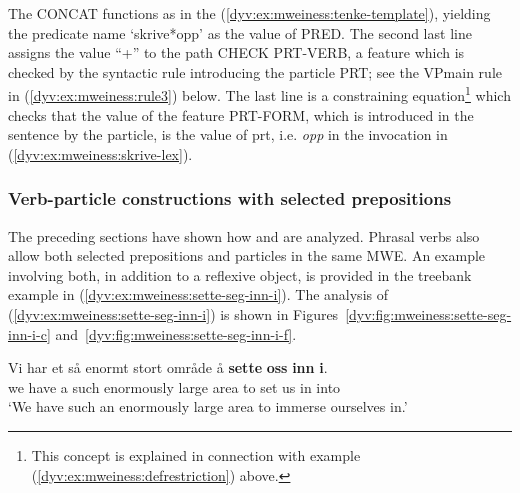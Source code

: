 \documentclass[output=paper]{langsci/langscibook}
\begin{document}
The CONCAT  functions as in the  (\ref{dyv:ex:mweiness:tenke-template}), yielding the  predicate name `skrive*opp' as the value of PRED.
The second last line assigns the value ``+'' to the path CHECK PRT-VERB, a feature which is checked by the syntactic rule introducing the particle PRT; see the VPmain rule in (\ref{dyv:ex:mweiness:rule3}) below.
The last line is a constraining equation\footnote{This concept is explained in connection with example (\ref{dyv:ex:mweiness:defrestriction}) above.} which checks that the value of the feature PRT-FORM, which is introduced in the sentence by the particle, is the value of prt, i.e. \emph{opp} in the  invocation in (\ref{dyv:ex:mweiness:skrive-lex}).

\subsubsection{Verb-particle constructions with selected prepositions}\label{dyv:sec:mweiness:prtprepverbs}

The preceding sections have shown how  and  are analyzed.
Phrasal verbs also allow both selected prepositions and particles in the same MWE.
An example involving both, in addition to a reflexive object, is provided in the treebank example in (\ref{dyv:ex:mweiness:sette-seg-inn-i}).
The analysis of (\ref{dyv:ex:mweiness:sette-seg-inn-i}) is shown in Figures~\ref{dyv:fig:mweiness:sette-seg-inn-i-c} and~\ref{dyv:fig:mweiness:sette-seg-inn-i-f}.

\ea\label{dyv:ex:mweiness:sette-seg-inn-i}
\gll Vi har et så enormt stort område å \textbf{sette} \textbf{oss} \textbf{inn} \textbf{i}.\\
     we have a such enormously large area to set us in into\\
\glt `We have such an enormously large area to immerse ourselves in.'
\z
\end{document}
